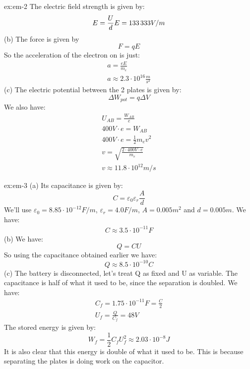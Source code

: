 \begin{solution}{ex:em-2}
  The electric field strength is given by:
  \[
    E=\frac{U}{d}\\
    E=133 \, 333 V/m
  \]
  (b) The force is given by
  \[
    F=qE
  \]
  So the acceleration of the electron on is just:
  \[
    \begin{gathered}
      a=\frac{eE}{m_e}\\
      a\approx2.3 \cdot 10^{16} \frac{m}{s^2}
    \end{gathered}
  \]
  (c) The electric potential between the 2 plates is given by:
  \[
    \Delta W_{pot} = q\Delta V
  \]
  We also have:
  \[
    \begin{gathered}
      U_{AB} = \frac{W_{AB}}{e}\\
      400V \cdot e = W_{AB}\\
      400V \cdot e = \frac{1}{2}m_e v^2\\
      v=\sqrt{\frac{2 \cdot 400V \cdot e}{m_e}}\\
      v\approx 11.8 \cdot 10^{12} m/s
    \end{gathered}
  \]
\end{solution}
\begin{solution}{ex:em-3}
  (a) Its capacitance is given by:
  \[
    C=\varepsilon_0\varepsilon_r \frac{A}{d}
  \]
  We'll use $\varepsilon_0 = 8.85 \cdot 10^{-12} F/m$, $\varepsilon_r = 4.0 F/m$, $A=0.005 m^2$ and $d=0.005 m$. We have:
  \[
    \begin{gathered}
      C\approx3.5 \cdot 10^{-11} F
    \end{gathered}
  \]
  (b)
  We have:
  \[
    Q=CU
  \]
  So using the capacitance obtained earlier we have:
  \[
    Q\approx8.5 \cdot 10^{-10} C
  \]
  (c) The battery is disconnected, let's treat Q as fixed and U as variable. The capacitance is half of what it used to be, since the separation is doubled. We have:
  \[
    \begin{gathered}
      C_f=1.75 \cdot 10^{-11} F = \frac{C}{2}\\
      U_f=\frac{Q}{C_f}=48 V
    \end{gathered}
  \]
  The stored energy is given by:
  \[
    W_f=\frac{1}{2}C_fU_f^2\approx2.03 \cdot 10^{-8} J
  \]
  It is also clear that this energy is double of what it used to be. This is because separating the plates is doing work on the capacitor.
\end{solution}
